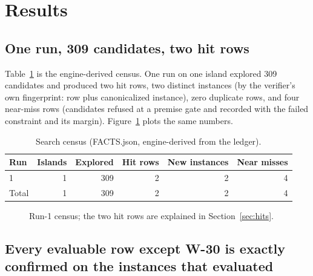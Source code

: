 \documentclass[11pt]{article}
\begin{document}
\section{Results}

\subsection{One run, 309 candidates, two hit rows}

Table~\ref{tab:census} is the engine-derived census. One run on one island explored 309 candidates and produced two hit rows, two distinct instances (by the verifier's own fingerprint: row plus canonicalized instance), zero duplicate rows, and four near-miss rows (candidates refused at a premise gate and recorded with the failed constraint and its margin). Figure~\ref{fig:census} plots the same numbers.

\begin{table}[t]
\centering
\caption{Search census (FACTS.json, engine-derived from the ledger).}
\label{tab:census}
\begin{tabular}{lrrrrr}
\toprule
Run & Islands & Explored & Hit rows & New instances & Near misses \\
\midrule
1 & 1 & 309 & 2 & 2 & 4 \\
\midrule
Total & 1 & 309 & 2 & 2 & 4 \\
\bottomrule
\end{tabular}
\end{table}

\begin{figure}[t]
\centering
{}
\caption{Run-1 census; the two hit rows are explained in Section~\ref{sec:hits}.}
\label{fig:census}
\end{figure}

\subsection{Every evaluable row except W-30 is exactly confirmed on the instances that evaluated}
\label{sec:confirm}
\end{document}
